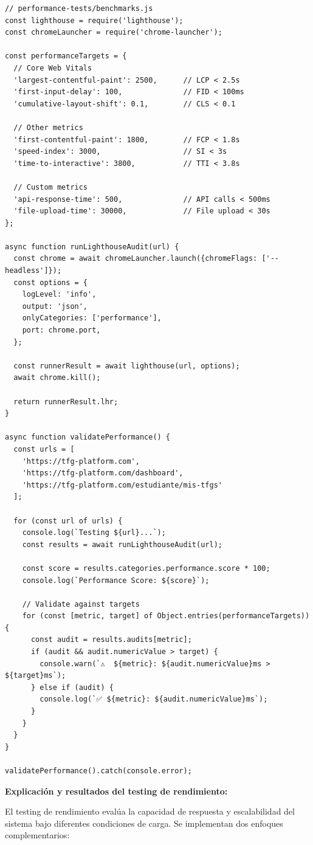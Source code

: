 \documentclass[12pt,a4paper,oneside]{report}
\begin{document}
\begin{lstlisting}
// performance-tests/benchmarks.js
const lighthouse = require('lighthouse');
const chromeLauncher = require('chrome-launcher');

const performanceTargets = {
  // Core Web Vitals
  'largest-contentful-paint': 2500,      // LCP < 2.5s
  'first-input-delay': 100,              // FID < 100ms  
  'cumulative-layout-shift': 0.1,        // CLS < 0.1

  // Other metrics
  'first-contentful-paint': 1800,        // FCP < 1.8s
  'speed-index': 3000,                   // SI < 3s
  'time-to-interactive': 3800,           // TTI < 3.8s

  // Custom metrics
  'api-response-time': 500,              // API calls < 500ms
  'file-upload-time': 30000,             // File upload < 30s
};

async function runLighthouseAudit(url) {
  const chrome = await chromeLauncher.launch({chromeFlags: ['--headless']});
  const options = {
    logLevel: 'info',
    output: 'json',
    onlyCategories: ['performance'],
    port: chrome.port,
  };

  const runnerResult = await lighthouse(url, options);
  await chrome.kill();

  return runnerResult.lhr;
}

async function validatePerformance() {
  const urls = [
    'https://tfg-platform.com',
    'https://tfg-platform.com/dashboard',
    'https://tfg-platform.com/estudiante/mis-tfgs'
  ];

  for (const url of urls) {
    console.log(`Testing ${url}...`);
    const results = await runLighthouseAudit(url);
    
    const score = results.categories.performance.score * 100;
    console.log(`Performance Score: ${score}`);
    
    // Validate against targets
    for (const [metric, target] of Object.entries(performanceTargets)) {
      const audit = results.audits[metric];
      if (audit && audit.numericValue > target) {
        console.warn(`⚠️  ${metric}: ${audit.numericValue}ms > ${target}ms`);
      } else if (audit) {
        console.log(`✅ ${metric}: ${audit.numericValue}ms`);
      }
    }
  }
}

validatePerformance().catch(console.error);
\end{lstlisting}

\textbf{Explicación y resultados del testing de rendimiento:}

El testing de rendimiento evalúa la capacidad de respuesta y escalabilidad del sistema bajo diferentes condiciones de carga. Se implementan dos enfoques complementarios:
\end{document}
